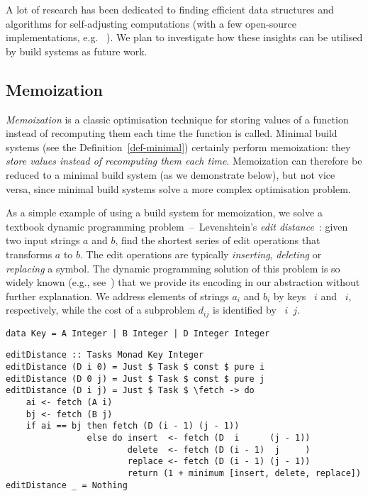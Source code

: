 A lot of research has been dedicated to finding efficient data structures and
algorithms for self-adjusting computations (with a few open-source
implementations, e.g. \Incremental~\cite{incremental}). We plan to investigate
how these insights can be utilised by build systems as future work.

\subsection{Memoization}\label{sec-related-memo}

\emph{Memoization} is a classic optimisation technique for storing values of a
function instead of recomputing them each time the function is called. Minimal
build systems (see the Definition~\ref{def-minimal}) certainly perform
memoization: they \emph{store values instead of recomputing them each time}.
Memoization can therefore be reduced to a minimal build system (as we
demonstrate below), but not vice versa, since minimal build systems solve a more
complex optimisation problem.

As a simple example of using a build system for memoization, we solve a textbook
dynamic programming problem~--~Levenshtein's \emph{edit
distance}~\cite{levenshtein1966binary}: given two input strings $a$ and
$b$, find the shortest series of edit operations that transforms $a$
to $b$. The edit operations are typically \emph{inserting}, \emph{deleting} or
\emph{replacing} a symbol. The dynamic programming solution of this problem is
so widely known (e.g., see~\cite{cormen2001introduction}) that we provide its
encoding in our  abstraction without further explanation.
We address elements of strings $a_i$ and $b_i$ by keys ~$i$ and ~$i$,
respectively, while the cost of a subproblem $d_{ij}$ is identified by
~$i$~$j$.

\begin{verbatim}
data Key = A Integer | B Integer | D Integer Integer
\end{verbatim}
\vspace{0mm}
\begin{verbatim}
editDistance :: Tasks Monad Key Integer
editDistance (D i 0) = Just $ Task $ const $ pure i
editDistance (D 0 j) = Just $ Task $ const $ pure j
editDistance (D i j) = Just $ Task $ \fetch -> do
    ai <- fetch (A i)
    bj <- fetch (B j)
    if ai == bj then fetch (D (i - 1) (j - 1))
                else do insert  <- fetch (D  i      (j - 1))
                        delete  <- fetch (D (i - 1)  j     )
                        replace <- fetch (D (i - 1) (j - 1))
                        return (1 + minimum [insert, delete, replace])
editDistance _ = Nothing
\end{verbatim}

